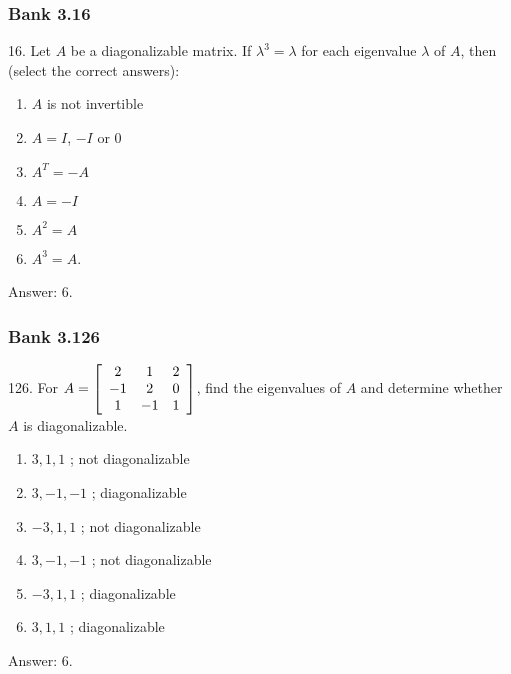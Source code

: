 \documentclass[pdf,9pt,t]{beamer}
\begin{document}
\begin{frame}[fragile]
    \frametitle{Bank 3.16}
    \begin{problem}
	16. Let $A$ be a diagonalizable matrix. If $\lambda^{3}=\lambda$ for each
	    eigenvalue $\lambda$ of $A$, then (select the correct answers):
	\begin{enumerate}
	    \item $A$ is not invertible
	    \item $A=I$, $-I$ or $0$
	    \item $A^{T}=-A$
	    \item $A=-I$
	    \item $A^{2}=A$
	    \item $A^{3}=A$.
	\end{enumerate}
    \end{problem}
    \pause
    Answer: 6.
\end{frame}

\begin{frame}[fragile]
    \frametitle{Bank 3.126}
    \begin{problem}
	126. For $A=\left[
	    \begin{array}[c]{ccc}
		2  &  1  &  2\\
		-1 &  2  &  0\\
		1  &  -1 &  1
	    \end{array}
	    \right]$, find the eigenvalues of $A$ and determine whether $A$ is diagonalizable.
	\begin{enumerate}
	    \item $3,1,1$   ; not diagonalizable
	    \item $3,-1,-1$ ; diagonalizable
	    \item $-3,1,1$  ; not diagonalizable
	    \item $3,-1,-1$ ; not diagonalizable
	    \item $-3,1,1$  ; diagonalizable
	    \item $3,1,1$   ; diagonalizable
	\end{enumerate}
    \end{problem}
    \pause
    Answer: 6.
\end{frame}
\end{document}
